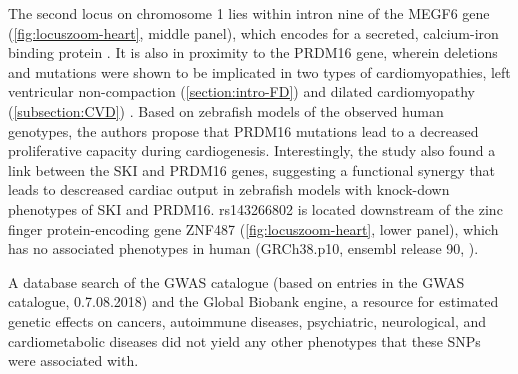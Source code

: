 The second locus on chromosome \num{1} lies within intron nine of the MEGF6 gene (\cref{fig:locuszoom-heart}, middle panel), which encodes for a secreted, calcium-iron binding protein \citep{Nakayama1998}. It is also in proximity to the PRDM16 gene, wherein deletions and mutations were shown to be implicated in two types of cardiomyopathies, left ventricular non-compaction (\cref{section:intro-FD}) and dilated cardiomyopathy  (\cref{subsection:CVD}) \citep{Arndt2013}. Based on zebrafish models of the observed human genotypes, the authors propose that PRDM16 mutations lead to a decreased proliferative capacity during cardiogenesis. Interestingly, the study also found a link between the SKI and PRDM16 genes, suggesting a functional synergy that leads to descreased cardiac output in zebrafish models with knock-down phenotypes of SKI and PRDM16. rs143266802 is located downstream of the zinc finger protein-encoding gene ZNF487 (\cref{fig:locuszoom-heart}, lower panel), which has no associated phenotypes in human (GRCh38.p10,  ensembl release 90, \citep{Aken2016}).  

A database search of the GWAS catalogue \citep{MacArthur2017} (based on entries in the GWAS catalogue, 0.7.08.2018) and the Global Biobank engine, a resource for estimated genetic effects on cancers, autoimmune diseases, psychiatric, neurological, and cardiometabolic diseases \citep{GBE2017} did not yield any other phenotypes that these SNPs were associated with.


